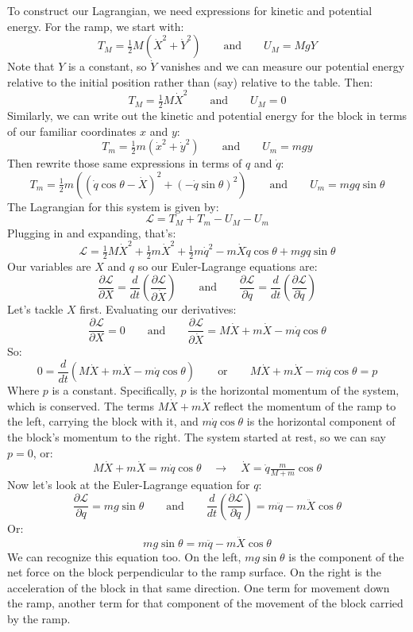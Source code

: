 \documentclass[12pt]{article}
\begin{document}
{To construct our Lagrangian, we need expressions for kinetic and potential energy. For the ramp, we start with:
$$
T_M = \tfrac{1}{2} M \left( \dot{X}^2 + \dot{Y}^2 \right)
\quad\quad \text{and} \quad\quad
U_M = MgY
$$
Note that $Y$ is a constant, so $\dot{Y}$ vanishes and we can measure our potential energy relative to the initial position rather than (say) relative to the table. Then:
$$
T_M = \tfrac{1}{2} M \dot{X}^2
\quad\quad \text{and} \quad\quad
U_M = 0
$$
Similarly, we can write out the kinetic and potential energy for the block in terms of our familiar coordinates $x$ and $y$:
$$
T_m = \tfrac{1}{2} m \left( \dot{x}^2 + \dot{y}^2 \right)
\quad\quad \text{and} \quad\quad
U_m = mgy
$$
Then rewrite those same expressions in terms of $q$ and $\dot{q}$:
$$
T_m = \tfrac{1}{2} m \left( \left( \dot{q} \cos\theta - \dot{X} \right)^2 + \left( -\dot{q} \sin\theta\right)^2 \right)
\quad\quad \text{and} \quad\quad
U_m = mgq\sin\theta
$$
The Lagrangian for this system is given by:
$$
\mathcal{L} = T_M + T_m - U_M - U_m
$$
Plugging in and expanding, that's:
$$
\mathcal{L} = \tfrac{1}{2} M \dot{X}^2 + \tfrac{1}{2} m \dot{X}^2 + \tfrac{1}{2} m \dot{q}^2 - m \dot{X} \dot{q} \cos\theta + m g q \sin\theta
$$
Our variables are $X$ and $q$ so our Euler-Lagrange equations are:
$$
\frac{\partial\mathcal{L}}{\partial X} = \frac{d}{dt} \left( \frac{\partial\mathcal{L}}{\partial \dot{X}} \right)
\quad\quad \text{and} \quad\quad
\frac{\partial\mathcal{L}}{\partial q} = \frac{d}{dt} \left( \frac{\partial\mathcal{L}}{\partial \dot{q}} \right)
$$
Let's tackle $X$ first. Evaluating our derivatives:
$$
\frac{\partial\mathcal{L}}{\partial X} = 0
\quad\quad \text{and} \quad\quad
\frac{\partial\mathcal{L}}{\partial \dot{X}} = M\dot{X} + m\dot{X} - m\dot{q}\cos\theta
$$
So:
$$
0 = \frac{d}{dt} \left( M\dot{X} + m\dot{X} - m\dot{q}\cos\theta \right)
\quad\quad \text{or} \quad\quad
M\dot{X} + m\dot{X} - m\dot{q}\cos\theta = p
$$
Where $p$ is a constant. Specifically, $p$ is the horizontal momentum of the system, which is conserved. The terms $M\dot{X} + m\dot{X}$ reflect the momentum of the ramp to the left, carrying the block with it, and $m\dot{q}\cos\theta$ is the horizontal component of the block's momentum to the right. The system started at rest, so we can say $p=0$, or:
$$
M\dot{X} + m\dot{X} = m\dot{q}\cos\theta
\quad\rightarrow\quad
\dot{X} = \dot{q} \tfrac{m}{M+m} \cos\theta
$$
Now let's look at the Euler-Lagrange equation for $q$:
$$
\frac{\partial\mathcal{L}}{\partial q} = mg\sin\theta
\quad\quad \text{and} \quad\quad
\frac{d}{dt} \left( \frac{\partial\mathcal{L}}{\partial \dot{q}} \right) = m\ddot{q} - m\ddot{X}\cos\theta
$$
Or:
$$
mg\sin\theta = m\ddot{q} - m\ddot{X}\cos\theta
$$
We can recognize this equation too. On the left, $mg\sin\theta$ is the component of the net force on the block perpendicular to the ramp surface. On the right is the acceleration of the block in that same direction. One term for movement down the ramp, another term for that component of the movement of the block carried by the ramp.

}
\end{document}
